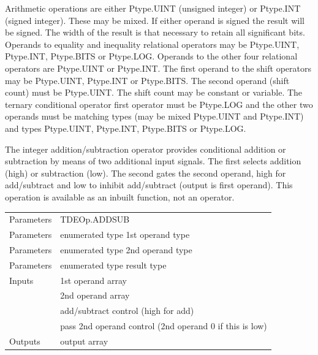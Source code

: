                 Arithmetic operations are either Ptype.UINT (unsigned integer)
                or Ptype.INT (signed integer). These may be mixed. If either
                operand is signed the result will be signed. The width of the
                result is that necessary to retain all significant bits.
                Operands to equality and inequality relational operators
                may be Ptype.UINT, Ptype.INT, Ptype.BITS or Ptype.LOG.
                Operands to the other four relational operators are
                Ptype.UINT or Ptype.INT. The first operand to the shift
                operators may be Ptype.UINT, Ptype.INT or Ptype.BITS. The
                second operand (shift count) must be Ptype.UINT. The shift count
                may be constant or variable. The ternary conditional operator
                first operator must be Ptype.LOG and the other two operands
                must be matching types (may be mixed Ptype.UINT and Ptype.INT)
                and types Ptype.UINT, Ptype.INT, Ptype.BITS or Ptype.LOG.
                
                The integer addition/subtraction operator provides conditional
                addition or subtraction by means of two additional input
                signals. The first selects addition (high) or subtraction (low).
                The second gates the second operand, high for add/subtract
                and low to inhibit add/subtract (output is first operand).
                This operation is available as an inbuilt function, not an
                operator.

                \begin{tabular}{| l | l |}
                \hline
                Parameters  & TDEOp.ADDSUB \\
                Parameters  & enumerated type 1st operand type \\
                Parameters  & enumerated type 2nd operand type \\
                Parameters  & enumerated type result type \\
                \hline
                Inputs      & 1st operand array \\
                            & 2nd operand array \\
                            & add/subtract control (high for add) \\
                            & pass 2nd operand control (2nd operand 0 if this is
                              low) \\
                \hline
                Outputs     & output array \\
                \hline
                \end{tabular}
                
